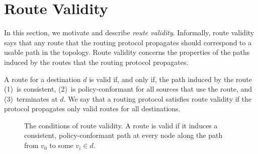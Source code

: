 \section{Route Validity}\label{sec:validity_def}

In this section, we motivate and describe {\em route validity}.
Informally, route validity says that any route that the routing protocol
propagates should correspond to a usable path in the topology.  Route
validity concerns the properties of the paths induced by the routes that
the routing protocol propagates.

\begin{defn}\label{defn:rv}
A route for a destination $d$ is valid if, and only if, the path induced
by the route (1)~is consistent, (2)~is policy-conformant for all sources
that use the route, and
(3)~terminates at $d$.  We say that a routing protocol satisfies route
validity if the protocol propagates only valid routes for all
destinations.
\end{defn}


\begin{figure}
\centering
\begin{psfrags}
%
%
\end{psfrags}
\caption[The conditions of route validity.]{The conditions of route
  validity.  A route is valid if it induces a consistent,
  policy-conformant path at every node along the path from $v_0$ to some
  $v_i \in d$.}
\label{fig:rv_expl}
\end{figure}


